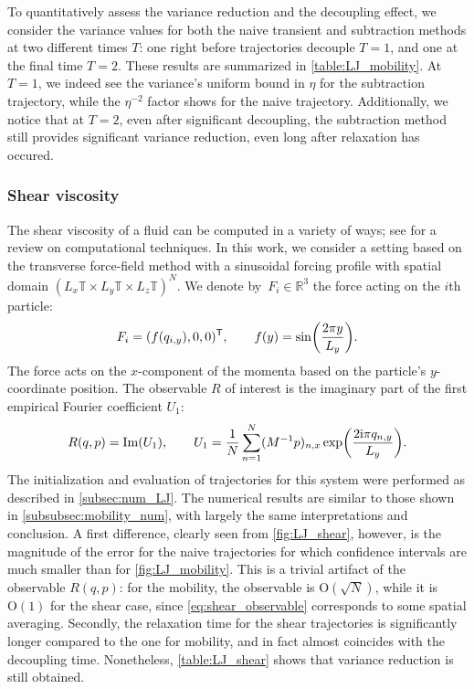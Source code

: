 \documentclass[11pt]{article}
\newcommand{\T}{\mathbb{T}}
\newcommand{\R}{\mathbb{R}}
\newcommand{\bigO}{\mathrm{O}}
\renewcommand{\t}{\mathsf T}
\renewcommand{\Im}{\operatorname{Im}}
\DeclarePairedDelimiter\paren{\lparen}{\rparen}
\theoremstyle{definition}
\begin{document}
To quantitatively assess the variance reduction and the decoupling effect, we consider the variance values for both the naive transient and subtraction methods at two different times $T$: one right before trajectories decouple $T=1$, and one at the final time $T=2$. These results are summarized in \cref{table:LJ_mobility}. At $T=1$, we indeed see the variance's uniform bound in $\eta$ for the subtraction trajectory, while the $\eta^{-2}$ factor shows for the naive trajectory. Additionally, we notice that at $T=2$, even after significant decoupling, the subtraction method still provides significant variance reduction, even long after relaxation has occured.

\subsubsection{Shear viscosity}
\label{subsubsec:shear}
The shear viscosity of a fluid can be computed in a variety of ways; see \cite{todd2007} for a review on computational techniques. In this work, we consider a setting based on the transverse force-field method \cite{gosling1973,joubaud2012} with a sinusoidal forcing profile with spatial domain $(L_x\T \times L_y\T \times L_z\T)^N$. We denote by~$F_i\in\R^3$ the force acting on the $i$th particle:
\begin{equation}
    \notag
    F_i = (f(q_{i,y}), 0, 0)^\t, \qquad  f(y) = \sin\paren*{\frac{2\pi y}{L_y}}.
\end{equation}
The force acts on the $x$-component of the momenta based on the particle's $y$-coordinate position.
The observable $R$ of interest is the imaginary part of the first empirical Fourier coefficient $U_1$:
\begin{equation}
    R(q,p) = \Im(U_1), \qquad U_1 = \frac{1}{N}\sum_{n=1}^N (M^{-1}p)_{n,x}\exp\paren*{\frac{2\mathrm{i}\pi q_{n,y}}{L_y}}.
    \label{eq:shear_observable}
\end{equation}
The initialization and evaluation of trajectories for this system were performed as described in \cref{subsec:num_LJ}. The numerical results are similar to those shown in \cref{subsubsec:mobility_num}, with largely the same interpretations and conclusion. A first difference, clearly seen from \cref{fig:LJ_shear}, however, is the magnitude of the error for the naive trajectories for which confidence intervals are much smaller than for \cref{fig:LJ_mobility}. This is a trivial artifact of the observable $R(q,p)$: for the mobility, the observable is $\bigO(\sqrt{N})$, while it is $\bigO(1)$ for the shear case, since \eqref{eq:shear_observable} corresponds to some spatial averaging. Secondly, the relaxation time for the shear trajectories is significantly longer compared to the one for mobility, and in fact almost coincides with the decoupling time. Nonetheless, \cref{table:LJ_shear} shows that variance reduction is still obtained.
\end{document}

